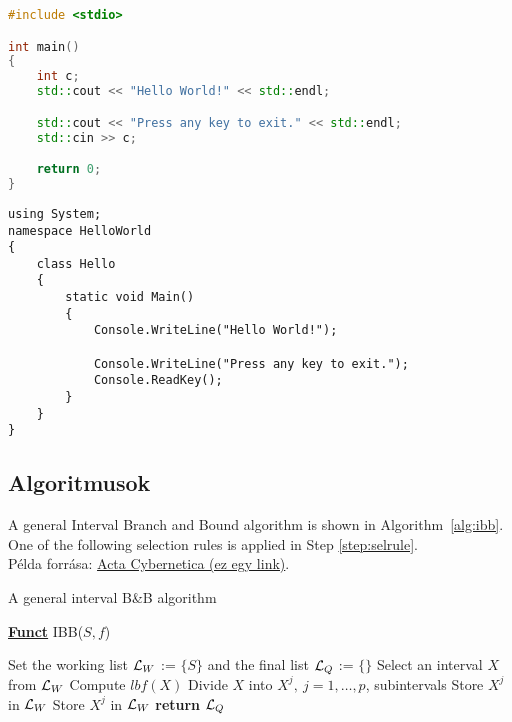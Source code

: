 \begin{lstlisting}[language={C++}]
#include <stdio>

int main()
{
	int c;
	std::cout << "Hello World!" << std::endl;

	std::cout << "Press any key to exit." << std::endl;
	std::cin >> c;

	return 0;
}
\end{lstlisting}

\begin{lstlisting}[language={[Sharp]C}]
using System;
namespace HelloWorld
{
	class Hello
	{
		static void Main()
		{
			Console.WriteLine("Hello World!");

			Console.WriteLine("Press any key to exit.");
			Console.ReadKey();
		}
	}
}
\end{lstlisting}

\subsection{Algoritmusok}

A general Interval Branch and Bound algorithm is shown in Algorithm~\ref{alg:ibb}. One of the following selection rules is applied in Step \ref{step:selrule}.\\
Példa forrása: \href{https://www.inf.u-szeged.hu/actacybernetica/}{Acta Cybernetica (ez egy link)}.

\begin{algorithm}[H]
\caption{A general interval B\&B algorithm}
\label{alg:ibb}
\textbf{\underline{Funct}} IBB($S,f$)
\begin{algorithmic}[1] %
\STATE Set the working list ${\cal L}_W$ := $\{S\}$ and the final list ${\cal L}_Q$ := $\{\}$
 \label{alg:igoend}
	\STATE  Select an interval $X$ from ${\cal L}_W$ \label{step:selrule}
	\STATE Compute $lbf(X)$ 
		\STATE Divide $X$ into $X^j,\ j=1,\dots, p$, subintervals   
				\STATE Store $X^j$ in ${\cal L}_W$
			\ELSE
				\STATE Store $X^j$ in ${\cal L}_W$
			\ENDIF
		\ENDFOR
	\ENDIF
\ENDWHILE
\STATE \textbf{return} ${\cal L}_Q$
\end{algorithmic}
\end{algorithm}
